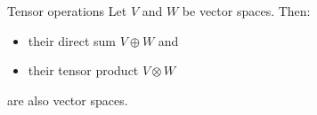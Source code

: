 \documentclass[handout,  12pt]{beamer}
\newcommand{\1}{\mathbf{1}}
\newcommand{\0}{\mathbf{0}}
\newcommand{\Ss}{\scriptstyle}
\begin{document}
	\begin{frame}{Tensor operations}
		Let $V$ and $W$ be vector spaces. Then:
		\begin{itemize}
			\item their direct sum $V \oplus W$ and
			\item their tensor product $V \otimes W$
		\end{itemize}
		are also vector spaces.
%
		

\end{frame}
\end{document}
